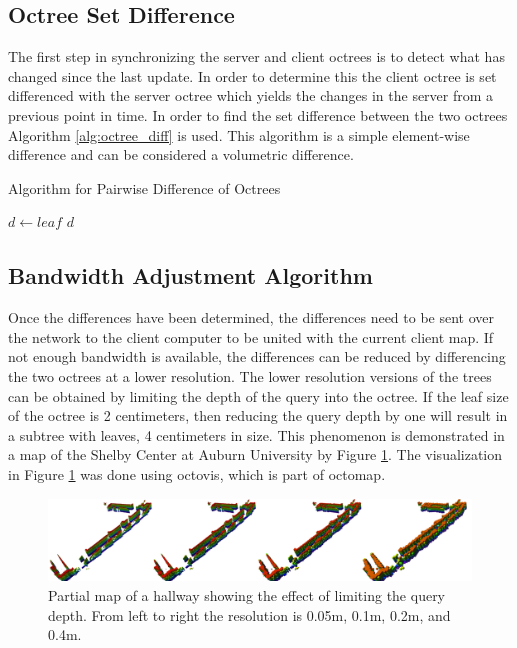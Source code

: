 \documentclass[12pt]{report}
\begin{document}
\subsection{Octree Set Difference}
The first step in synchronizing the server and client octrees is to detect what has changed since the last update. In order to determine this the client octree is set differenced with the server octree which yields the changes in the server from a previous point in time. In order to find the set difference between the two octrees Algorithm \ref{alg:octree_diff} is used. This algorithm is a simple element-wise difference and can be considered a volumetric difference.

\begin{algorithm}
\caption{Algorithm for Pairwise Difference of Octrees}
\label{alg:octree_diff}
\begin{algorithmic}
  \STATE {}
  \STATE {}
  \STATE {}
      \STATE $d\gets leaf$
    \ENDIF
  \ENDFOR
  \RETURN $d$
\end{algorithmic}
\end{algorithm}

\subsection{Bandwidth Adjustment Algorithm}
Once the differences have been determined, the differences need to be sent over the network to the client computer to be united with the current client map. If not enough bandwidth is available, the differences can be reduced by differencing the two octrees at a lower resolution. The lower resolution versions of the trees can be obtained by limiting the depth of the query into the octree. If the leaf size of the octree is 2 centimeters, then reducing the query depth by one will result in a subtree with leaves, 4 centimeters in size.  This phenomenon is demonstrated in a map of the Shelby Center at Auburn University by Figure \ref{fig:treedepth}.  The visualization in Figure \ref{fig:treedepth} was done using octovis\cite{octomap}, which is part of octomap.

\begin{figure}[ht]
  \centering
  \includegraphics[width=6in,keepaspectratio]{ShelbySE_2f_combined_octovis.png}
  \caption{Partial map of a hallway showing the effect of limiting the query 
           depth.  From left to right the resolution is 0.05m, 0.1m, 0.2m,
           and 0.4m.}
  \label{fig:treedepth}
\end{figure}
\end{document}
